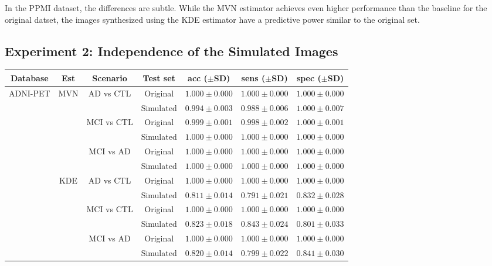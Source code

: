 In the PPMI dataset, the differences are subtle. While the \ac{MVN} estimator achieves even higher performance than the baseline for the original datset, the images synthesized using the \ac{KDE} estimator have a predictive power similar to the original set. 


\subsection{Experiment 2: Independence of the Simulated Images}
\begin{bigtable}
	\begin{tabular}{ccccccc}
		\toprule
		Database & Est & Scenario & Test set & acc ($\pm$SD) & sens ($\pm$SD) & spec ($\pm$SD)\\
		\midrule
		\multirow{12}{*}{ADNI-PET} & \multirow{6}{*}{\ac{MVN}} & \multirow{2}{*}{\ac{AD} vs \ac{CTL}} & Original & $1.000 \pm 0.000 $ & $1.000 \pm 0.000 $ & $1.000 \pm 0.000 $\\
		& & &  Simulated & $0.994 \pm 0.003 $ & $0.988 \pm 0.006$ & $1.000 \pm 0.007$\\ \cline{3-7}
		& & \multirow{2}{*}{\ac{MCI} vs \ac{CTL}} & Original & $0.999 \pm 0.001 $ & $0.998 \pm 0.002 $ & $1.000 \pm 0.001 $\\
		& & & Simulated &  $1.000 \pm 0.000 $ & $1.000 \pm 0.000 $ & $1.000 \pm 0.000 $\\ \cline{3-7}
		& & \multirow{2}{*}{\ac{MCI} vs \ac{AD}} & Original & $1.000 \pm 0.000 $ & $1.000 \pm 0.000 $ & $1.000 \pm 0.000 $\\
		& & & Simulated & $1.000 \pm 0.000 $ & $1.000 \pm 0.000 $ & $1.000 \pm 0.000 $\\ \cline{2-7}
		& \multirow{6}{*}{\ac{KDE}} & \multirow{2}{*}{\ac{AD} vs \ac{CTL}} & Original & $1.000 \pm 0.000 $ & $1.000 \pm 0.000 $ & $1.000 \pm 0.000 $\\
		& & &  Simulated & $0.811 \pm 0.014 $ & $0.791 \pm 0.021$ & $0.832 \pm 0.028$\\ \cline{3-7}
		& & \multirow{2}{*}{\ac{MCI} vs \ac{CTL}} & Original & $1.000 \pm 0.000 $ & $1.000 \pm 0.000 $ & $1.000 \pm 0.000 $\\
		& & & Simulated & $0.823 \pm 0.018 $ & $0.843 \pm 0.024 $ & $0.801 \pm 0.033 $\\ \cline{3-7}
		& & \multirow{2}{*}{\ac{MCI} vs \ac{AD}} & Original & $1.000 \pm 0.000 $ & $1.000 \pm 0.000 $ & $1.000 \pm 0.000 $\\
		& & & Simulated & $0.820 \pm 0.014 $ & $0.799 \pm 0.022 $ & $0.841 \pm 0.030 $\\ 

\end{tabular}
\end{bigtable}
